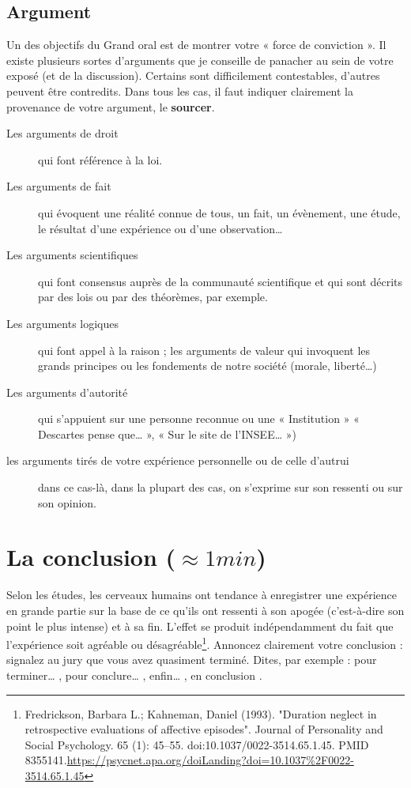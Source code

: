 \subsection*{Argument}
Un des objectifs du Grand oral est de montrer votre « force de conviction ».
Il existe plusieurs sortes d’arguments que je conseille de panacher au sein de votre exposé (et de la discussion). Certains sont difficilement contestables, d’autres peuvent être contredits.
Dans tous les cas, il faut indiquer clairement la provenance de votre argument, le \textbf{sourcer}.
\begin{description}
    \item[Les arguments de droit] qui font référence à la loi.
    \item[Les arguments de fait] qui évoquent une réalité connue de tous, un fait,
un évènement, une étude, le résultat d’une expérience ou d’une observation…
    \item[Les arguments scientifiques] qui font consensus auprès de la communauté
scientifique et qui sont décrits par des lois ou par des théorèmes, par exemple.
    \item[Les arguments logiques] qui font appel à la raison ; les arguments de valeur qui invoquent les grands principes ou les fondements de notre société (morale, liberté…)
    \item[Les arguments d’autorité] qui s'appuient sur une personne reconnue ou une « Institution » « Descartes pense que… », « Sur le site de l’INSEE… »)
    \item[les arguments tirés de votre expérience personnelle ou de celle d’autrui] dans ce cas-là, dans la plupart des cas, on s'exprime sur son ressenti ou sur son opinion.
\end{description}

\section{La conclusion ($\approx 1min$)}

Selon les études, les cerveaux humains ont tendance à enregistrer une expérience en grande partie sur la base de ce qu'ils ont ressenti à son apogée (c'est-à-dire son point le plus intense) et à sa fin.
L’effet se produit indépendamment du fait que l’expérience soit agréable ou désagréable\footnote{Fredrickson, Barbara L.; Kahneman, Daniel (1993). "Duration neglect in retrospective evaluations of affective episodes". Journal of Personality and Social Psychology. 65 (1): 45–55. doi:10.1037/0022-3514.65.1.45. PMID 8355141.\url{https://psycnet.apa.org/doiLanding?doi=10.1037\%2F0022-3514.65.1.45}}.
Annoncez clairement votre conclusion : signalez au jury que vous avez quasiment terminé. Dites, par exemple : \og pour terminer… \fg, \og pour conclure… \fg, \og enfin… \fg, \og en conclusion \fg.

